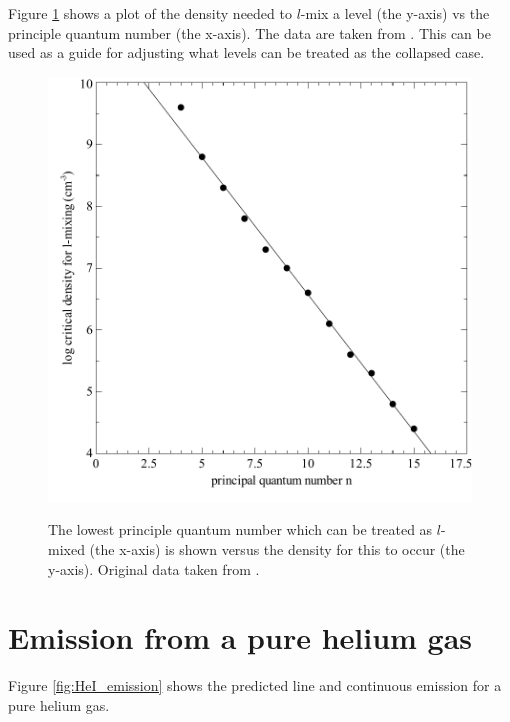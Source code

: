 Figure \ref{fig:l_mixed_pengelly_seaton} shows a plot of the density needed to $l$-mix a level (the y-axis)
vs the principle quantum number (the x-axis).  The data are taken from
\citet{PengellySeaton1964}.
This can be used as a guide for adjusting what
levels can be treated as the collapsed case.

\begin{figure}
\centering
\includegraphics{l_mixed_pengelly_seaton}
\label{fig:l_mixed_pengelly_seaton}
\caption[l-mixed principle quantum number vs density]
{The lowest principle quantum number which can be treated as $l$-mixed
(the x-axis) is shown versus the density for this to occur (the y-axis).
Original data taken from \citet{PengellySeaton1964}.}
\end{figure}

\section{Emission from a pure helium gas}

Figure \ref{fig:HeI_emission} shows the predicted line and continuous
emission for a pure helium gas.

